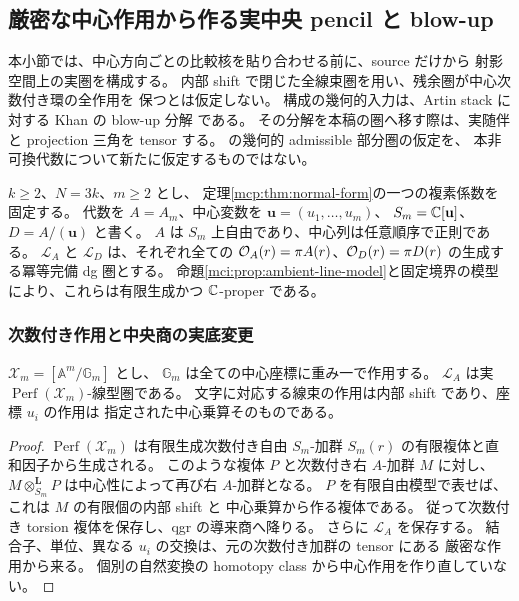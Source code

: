 \subsection{厳密な中心作用から作る実中央 pencil と blow-up}
\label{mbl:subsec:central-blowup}

本小節では、中心方向ごとの比較核を貼り合わせる前に、source だけから
射影空間上の実圏を構成する。
内部 shift で閉じた全線束圏を用い、残余圏が中心次数付き環の全作用を
保つとは仮定しない。
構成の幾何的入力は、Artin stack に対する Khan の blow-up 分解
\cite[Theorem~C, Proposition~4.2 and Sections~4.3--4.4]{CMOKhanBlowups}である。
その分解を本稿の圏へ移す際は、実随伴と projection 三角を tensor する。
\cite[Section~1.5]{CMOJiangLeungBlowup}の幾何的 admissible 部分圏の仮定を、
本非可換代数について新たに仮定するものではない。

$k\ge2$、$N=3k$、$m\ge2$ とし、
定理\ref{mcp:thm:normal-form}の一つの複素係数を固定する。
代数を $A=A_m$、中心変数を $\mathbf u=(u_1,\ldots,u_m)$、
$S_m=\mathbb C[\mathbf u]$、$D=A/(\mathbf u)$ と書く。
$A$ は $S_m$ 上自由であり、中心列は任意順序で正則である。
$\mathcal L_A$ と $\mathcal L_D$ は、それぞれ全ての
$\mathcal O_A(r)=\pi A(r)$、$\mathcal O_D(r)=\pi D(r)$ の生成する冪等完備 dg 圏とする。
命題\ref{mci:prop:ambient-line-model}と固定境界の模型により、これらは有限生成かつ
$\mathbb C$-proper である。

\subsubsection{次数付き作用と中央商の実底変更}

\begin{lemma}[全線束圏の厳密な中心作用]
\label{mbl:lem:strict-action}
$\mathscr X_m=[\mathbb A^m/\mathbb G_m]$ とし、
$\mathbb G_m$ は全ての中心座標に重み一で作用する。
$\mathcal L_A$ は実 $\operatorname{Perf}(\mathscr X_m)$-線型圏である。
文字に対応する線束の作用は内部 shift であり、座標 $u_i$ の作用は
指定された中心乗算そのものである。
\end{lemma}

\begin{proof}
$\operatorname{Perf}(\mathscr X_m)$ は有限生成次数付き自由 $S_m$-加群
$S_m(r)$ の有限複体と直和因子から生成される。
このような複体 $P$ と次数付き右 $A$-加群 $M$ に対し、
$M\otimes_{S_m}^{\mathbf L}P$ は中心性によって再び右 $A$-加群となる。
$P$ を有限自由模型で表せば、これは $M$ の有限個の内部 shift と
中心乗算から作る複体である。
従って次数付き torsion 複体を保存し、qgr の導来商へ降りる。
さらに $\mathcal L_A$ を保存する。
結合子、単位、異なる $u_i$ の交換は、元の次数付き加群の tensor にある
厳密な作用から来る。
個別の自然変換の homotopy class から中心作用を作り直していない。
\end{proof}

